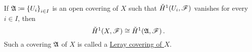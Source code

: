 \documentclass[../Moduli_Spaces_of_Riemann_Surfaces.tex]{subfiles}
\begin{document}
    \begin{proposition}[Leray]\label{CC:prp:leray}
        If $\mathfrak{A}\coloneqq\left\{U_i\right\}_{i\in I}$ is an open covering of $X$ such that $\check{H}^1\!\left(U_i,\mathscr{F}\right)$ vanishes for every $i\in I$, then
        \begin{equation*}
            \check{H}^1\!\left(X,\mathscr{F}\right)\cong\check{H}^1\!\left(\mathfrak{A},\mathscr{F}\right).
        \end{equation*}
        Such a covering $\mathfrak{A}$ of $X$ is called a \ul{Leray covering of $X$}.
    \end{proposition}
\end{document}
